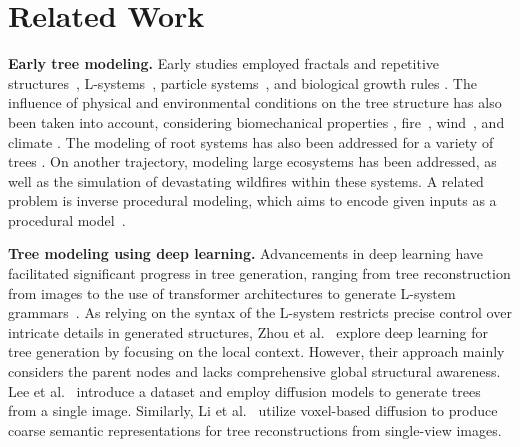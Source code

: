 \section{Related Work}
\noindent\textbf{Early tree modeling.}
Early studies employed fractals and repetitive structures~\cite{smith1984plants}, L-systems~\cite{lindenmayer1968mathematical,prusinkiewicz1986graphical, prusinkiewicz2012algorithmic}, particle systems~\cite{reeves1985approximate, neubert2007approximate}, and biological growth rules \cite{de1988plant}. 
The influence of physical and environmental conditions on the tree structure has also been taken into account, considering biomechanical properties \cite{Zhao2013,10.1145/3072959.3073655,Maggioli23}, fire~\cite{Pirk:2017}, wind~\cite{Pirk14ToG,Shao:2021:GraphLearning}, and climate \cite{10.1145/3528223.3530146}. The modeling of root systems has also been addressed for a variety of trees \cite{Li:2023:Rhizomorph}. On another trajectory, modeling large ecosystems \cite{makowski2019synthetic} has been addressed, as well as the simulation of devastating wildfires \cite{Haedrich:2021:Wildfires,Kokosza:2024:Scintilla} within these systems.
A related problem is inverse procedural modeling, which aims to encode given inputs as a procedural model~\cite{stava2014inverse,guo2020inverse}.


\noindent\textbf{Tree modeling using deep learning.}
Advancements in deep learning have facilitated significant progress in tree generation, ranging from tree reconstruction from images \cite{Li:2021:ReconstructBotanicalTrees} to the use of transformer architectures to generate L-system grammars~\cite{lee2023latent}. As relying on the syntax of the L-system restricts precise control over intricate details in generated structures, Zhou et al.~\cite{zhou2023deeptree} explore deep learning for tree generation by focusing on the local context. However, their approach mainly considers the parent nodes and lacks comprehensive global structural awareness. Lee et al.~\cite{lee2025tree} introduce a dataset and employ diffusion models to generate trees from a single image. Similarly, Li et al.~\cite{li2024svdtree} utilize voxel-based diffusion to produce coarse semantic representations for tree reconstructions from single-view images. 

